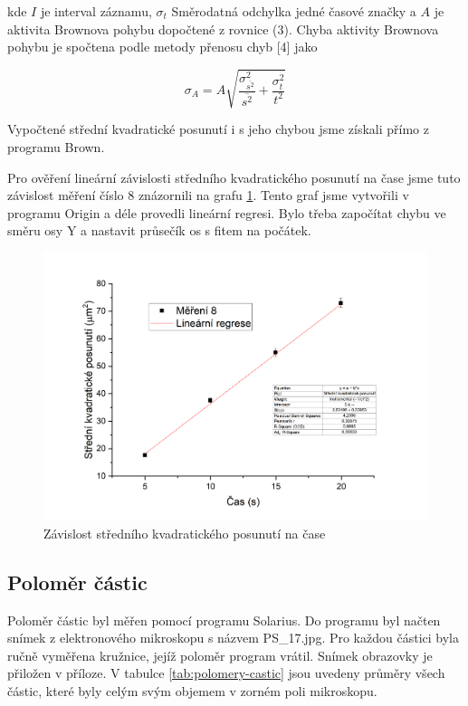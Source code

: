 kde $I$ je interval záznamu, \(\sigma_t\) Směrodatná odchylka jedné časové značky a $A$ je aktivita Brownova pohybu dopočtené z rovnice (3). Chyba aktivity Brownova pohybu je spočtena podle metody přenosu chyb [4] jako

\begin{equation}
    \sigma_A = A \sqrt{\frac{\sigma^2_{\overline{s^2}}}{\overline{s^2}} + \frac{\sigma^2_t}{t^2}}
\end{equation}

Vypočtené střední kvadratické posunutí i s jeho chybou jsme získali přímo z programu Brown.

Pro ověření lineární závislosti středního kvadratického posunutí na čase jsme tuto závislost měření číslo 8 znázornili na grafu \ref{fig:posunuti-na-case}. Tento graf jsme vytvořili v programu Origin a déle provedli lineární regresi. Bylo třeba započítat chybu ve směru osy Y a nastavit průsečík os s fitem na počátek.

\begin{figure}[h]
    \centering
    \includegraphics[width=0.85\linewidth]{16 - Studium Brownova pohybu//Protokol - Brownův pohyb//img/Závislost posunutí na čase.png}
    \caption{Závislost středního kvadratického posunutí na čase}
    \label{fig:posunuti-na-case}
\end{figure}

\newpage
\subsection{Poloměr částic}
Poloměr částic byl měřen pomocí programu Solarius. Do programu byl načten snímek z elektronového mikroskopu s názvem PS\_17.jpg. Pro každou částici byla ručně vyměřena kružnice, jejíž poloměr program vrátil. Snímek obrazovky je přiložen v příloze. V tabulce \ref{tab:polomery-castic} jsou uvedeny průměry všech částic, které byly celým svým objemem v zorném poli mikroskopu.

